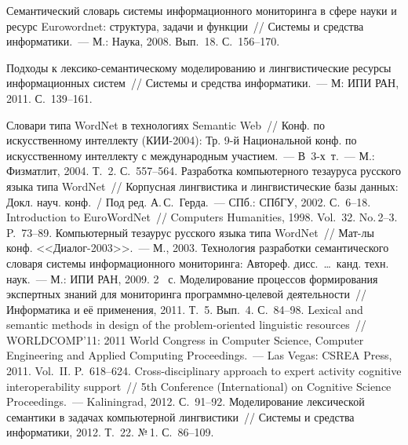 \begin{multicols}{2}
{{\begin{thebibliography}{99}
 Семантический словарь системы информационного мониторинга в 
сфере науки и ресурс Eurowordnet: структура, задачи и функции~// Сис\-те\-мы и средства 
информатики.~---  М.: Наука, 2008. Вып.~18. С.~156--170.

 Подходы к лек\-си\-ко-се\-ман\-ти\-че\-ско\-му моделированию и 
лингвистические ресурсы информационных сис\-тем~// Сис\-те\-мы и средства 
информатики.~--- М: ИПИ РАН, 2011. С.~139--161.

 Словари типа WordNet в технологиях Semantic 
Web~// Конф. по искусственному интеллекту (КИИ-2004): Тр. 9-й Национальной 
конф. по искусственному интеллекту с международным участием.~--- В~3-х~т.~--- М.: 
Физ\-мат\-лит, 2004. Т.~2. С.~557--564.
 Разработка компьютерного тезауруса русского языка типа WordNet~// 
Корпусная лингвистика и лингвистические базы данных: Докл. науч. конф.~/ Под 
ред. А.\,С.~Герда.~--- СПб.: СПбГУ, 2002. С.~6--18.
 Introduction to EuroWordNet~// Computers  Humanities, 1998. Vol.~32. 
No.\,2--3. P.~73--89.
 Компьютерный тезаурус 
русского языка типа WordNet~// Мат-лы конф. <<Диалог-2003>>.~--- М., 2003.
 Технология разработки семантического словаря системы 
информационного мониторинга: Автореф. дисс.\ \ldots\  канд. техн. наук.~--- М.: ИПИ 
РАН, 2009. 2~ с.
 Моделирование процессов формирования экспертных 
знаний для мониторинга про\-грам\-мно-це\-ле\-вой деятельности~// Информатика и её 
применения, 2011. Т.~5. Вып.~4. С.~84--98.
 Lexical and semantic methods in design of the problem-oriented linguistic 
resources~// WORLDCOMP'11:  2011 World Congress in Computer Science, Computer 
Engineering and Applied Computing Proceedings.~--- Las Vegas: CSREA Press, 2011. Vol.~II. 
P.~618--624.
 Cross-disciplinary approach to expert activity cognitive interoperability 
support~//  5th Conference (International) on Cognitive Science Proceedings.~--- Kaliningrad, 
 2012. С.~91--92.
 Моделирование лексической семантики в задачах компьютерной 
лингвистики~//  Сис\-те\-мы и средства информатики, 2012. Т.~22. №\,1. С.~86--109.

\end{thebibliography}}}
\end{multicols}
